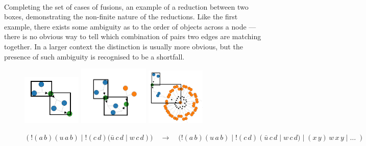 \begin{examples}{~\\}
            Completing the set of cases of fusions, an example of a reduction between two boxes, demonstrating the non-finite nature of the reductions.
            Like the first example, there exists some ambiguity as to the order of objects across a node --- there is no obvious way to tell which combination of pairs two edges are matching together.
            In a larger context the distinction is usually more obvious, but the presence of such ambiguity is recognised to be a shortfall.
            \begin{figure}[H]
                \centering
                \includegraphics[width=0.25\textwidth]{diagrams/box-box.png}
                \includegraphics[width=0.3\textwidth]{diagrams/box-box-reduction.png}
                \includegraphics[width=0.25\textwidth]{diagrams/box-box-many-reduction.png}
                \caption*{$(!(a \, b)(u \, a \, b) \; | \; !(c \, d)(\bar{u} \, c \, d \; | \; w \, c \, d)) \quad \rightarrow \quad (!(a \, b)(u \, a \, b) \; | \; !(c \, d)(\bar{u} \, c \, d \; | \; w \, c \, d) \; | \; (x \, y) \, w \, x \, y \; | \; \ldots \;)$}
            \end{figure}~\\
                        

\end{examples}
